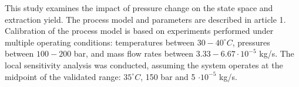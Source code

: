 \documentclass[../Article_Sensitivity_Analsysis.tex]{subfiles}
\begin{document}
	
	\label{CH: Results}
	
	
	This study examines the impact of pressure change on the state space and extraction yield. The process model and parameters are described in {\color{red}article 1}. Calibration of the process model is based on experiments performed under multiple  operating conditions: temperatures between $30 - 40^\circ C$, pressures between $100 - 200$ bar, and mass flow rates between $3.33-6.67 \cdot 10^{-5}$ kg/s. The local sensitivity analysis was conducted, assuming the system operates at the midpoint of the validated range: $35^\circ C$, 150 bar and 5 $\cdot 10^{-5}$ kg/s.
	
        
    
    
	
\end{document}
